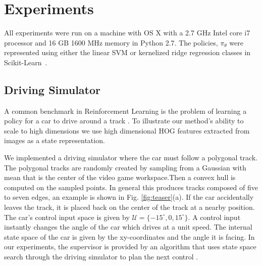 \documentclass[10pt, conference]{ieeeconf}      %
\begin{document}


\section{Experiments}
All experiments were run on a machine with OS X with a 2.7 GHz Intel core i7 processor and 16 GB
1600 MHz memory in Python 2.7. The policies, $\pi_\theta$ were represented using either the linear SVM or  kernelized ridge regression classes in Scikit-Learn~\cite{scikit-learn}.

\subsection{Driving Simulator} \label{sec:car}
A common benchmark in Reinforcement Learning is the problem of learning a policy for a car to drive around a track
\cite{argall2009survey}. To illustrate our method's ability to scale to high dimensions we use high dimensional HOG features extracted from images
as a state representation. 

We implemented a driving simulator where the car must follow a polygonal track. The polygonal tracks are randomly created by sampling from a Gaussian with mean that is the center of the video game workspace.Then a convex hull is computed on the sampled points. In general this produces tracks composed of five to seven edges, an example is shown in Fig. \ref{fig:teaser}(a). If the car accidentally leaves the track, it is placed
back on the center of the track at a nearby position. The car's control input space is given by  $\mathcal{U} = \lbrace
-15^\circ, 0, 15^\circ \rbrace$. A control input instantly changes the angle of the car which drives at a unit speed. 
The internal state space of the car is given by the
xy-coordinates and the angle it is facing. In our experiments, the supervisor is provided by an algorithm that uses
state space search through the driving simulator to plan the next control .
\end{document}
